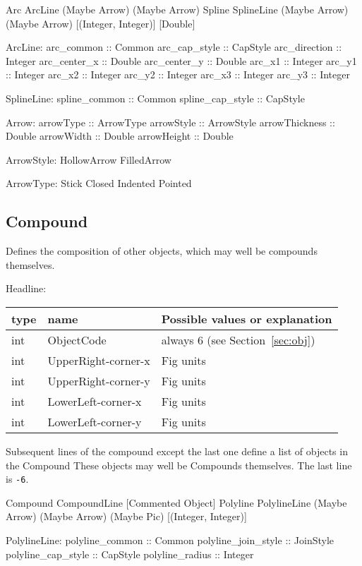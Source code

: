 \documentclass[10pt, a4paper]{article}
\begin{document}
Arc ArcLine (Maybe Arrow) (Maybe Arrow)	 
Spline SplineLine (Maybe Arrow) (Maybe Arrow) [(Integer, Integer)] [Double]

ArcLine:
arc\_common :: Common
arc\_cap\_style :: CapStyle
arc\_direction :: Integer
arc\_center\_x :: Double
arc\_center\_y :: Double
arc\_x1 :: Integer
arc\_y1 :: Integer
arc\_x2 :: Integer
arc\_y2 :: Integer
arc\_x3 :: Integer
arc\_y3 :: Integer

SplineLine:
spline\_common :: Common
spline\_cap\_style :: CapStyle

Arrow:
arrowType :: ArrowType
arrowStyle :: ArrowStyle
arrowThickness :: Double
arrowWidth :: Double
arrowHeight :: Double


ArrowStyle:
HollowArrow	 
FilledArrow	 


ArrowType:
Stick	 
Closed	 
Indented	 
Pointed	 


 
\subsection{Compound}\label{subsec:compound}

Defines the composition of other objects, 
which may well be compounds themselves. 

\noindent
Headline: \\
%
\begin{tabular}{|lll|}
\hline
type & name & Possible values or explanation \\
\hline
\hline
int & ObjectCode          & always 6 (see Section~\ref{sec:obj}) \\
int & UpperRight-corner-x & Fig units \\
int & UpperRight-corner-y & Fig units \\
int & LowerLeft-corner-x  & Fig units \\
int & LowerLeft-corner-y  & Fig units \\
\hline
\end{tabular}

Subsequent lines of the compound except the last one 
define a list of objects in the Compound
These objects may well be Compounds themselves. 
The last line is {\tt-6}. 

Compound CompoundLine [Commented Object]	 
Polyline PolylineLine (Maybe Arrow) (Maybe Arrow) (Maybe Pic) [(Integer, Integer)]	 



PolylineLine:
polyline\_common :: Common
polyline\_join\_style :: JoinStyle
polyline\_cap\_style :: CapStyle
polyline\_radius :: Integer
\end{document}
